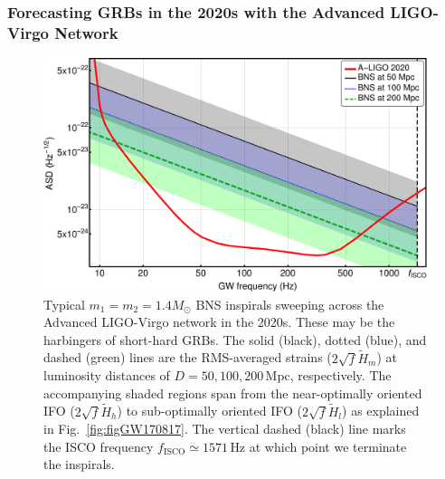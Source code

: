 \documentclass[prd,amsmath,amssymb,aps,floats,amsfonts,notitlepage,superscriptaddress,eqsecnum,nofootinbib,10pt]{revtex4-1}
\begin{document}
\subsubsection{Forecasting GRBs in the 2020s with the Advanced LIGO-Virgo Network}\label{Sec:ALIGO2020}
%
%
\begin{figure}[ht!]
\includegraphics[width=\linewidth]{../Figures/ALigo_strains.pdf}
\caption{Typical $m_1=m_2=1.4 M_\odot$ BNS inspirals sweeping across the Advanced LIGO-Virgo network in the 2020s.
These may be the harbingers of short-hard GRBs.
The solid (black), dotted (blue), and dashed (green) lines are the RMS-averaged strains ($2\sqrt{f}\tilde{H}_m$) at luminosity distances of $D=50, 100, 200\,$Mpc, respectively. The accompanying shaded regions span from the near-optimally oriented IFO 
($2\sqrt{f}\tilde{H}_h$) to
sub-optimally oriented IFO ($2\sqrt{f}\tilde{H}_l$) as explained in Fig.~\ref{fig:figGW170817}.
The vertical dashed (black) line marks the ISCO frequency $f_\text{ISCO} \simeq 1571\,$Hz at which point we terminate the inspirals.
}
\label{fig:LIGO2020}
\end{figure}
%
%
\end{document}
